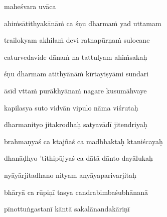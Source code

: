 maheśvara uvāca~{\dandab}\dontdisplaylinenum 

ahi\.msātithyakānā\.m ca śṇu dharma\.m yad uttamam\thinspace{\danda} \dontdisplaylinenum

trailokyam akhila\.m devi ratnapūrṇa\.m sulocane \veg\dontdisplaylinenum

caturvedavide dāna\.m na tattulyam ahi\.msakaḥ\thinspace{\dandab} \dontdisplaylinenum

śṇu dharmam atithyānā\.m kīrtayiṣyāmi sundari \veg\dontdisplaylinenum


āsīd vtta\.m purākhyāna\.m nagare kusumāhvaye\thinspace{\dandab} \dontdisplaylinenum

kapilasya suto vidvān vipulo nāma viśrutaḥ \veg\dontdisplaylinenum

dharmanityo jitakrodhaḥ satyavādī jitendriyaḥ\thinspace{\dandab} \dontdisplaylinenum

brahmaṇyaś ca ktajñaś ca madbhaktaḥ ktaniścayaḥ \veg\dontdisplaylinenum

dhanāḍhyo 'tithipūjyaś ca dātā dānto dayālukaḥ\thinspace{\dandab} \dontdisplaylinenum

nyāyārjitadhano nityam anyāyaparivarjitaḥ \veg\dontdisplaylinenum

bhāryā ca rūpiṇī tasya candrabimbaśubhānanā\thinspace{\dandab} \dontdisplaylinenum

pīnottuṅgastanī kāntā sakalānandakāriṇī \danda\dontdisplaylinenum

